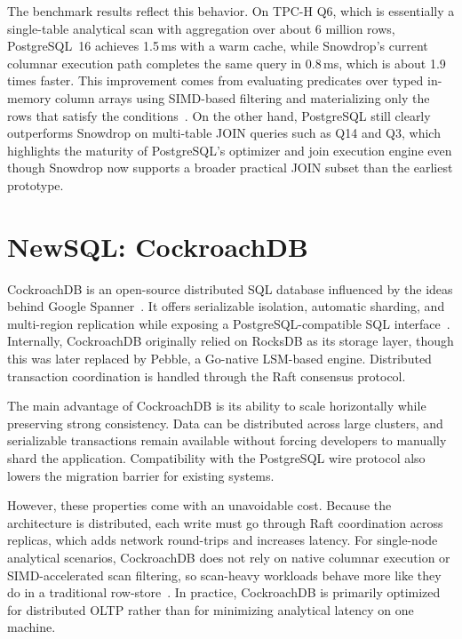 The benchmark results reflect this behavior. On TPC-H Q6, which is essentially a single-table analytical scan with aggregation over about 6 million rows, PostgreSQL~16 achieves 1.5\,ms with a warm cache, while Snowdrop’s current columnar execution path completes the same query in 0.8\,ms, which is about 1.9 times faster. This improvement comes from evaluating predicates over typed in-memory column arrays using SIMD-based filtering and materializing only the rows that satisfy the conditions~\cite{zhou2002}. On the other hand, PostgreSQL still clearly outperforms Snowdrop on multi-table JOIN queries such as Q14 and Q3, which highlights the maturity of PostgreSQL’s optimizer and join execution engine even though Snowdrop now supports a broader practical JOIN subset than the earliest prototype.

\section{NewSQL: CockroachDB}

CockroachDB is an open-source distributed SQL database influenced by the ideas behind Google Spanner~\cite{corbett2012}. It offers serializable isolation, automatic sharding, and multi-region replication while exposing a PostgreSQL-compatible SQL interface~\cite{cockroachdb2025}. Internally, CockroachDB originally relied on RocksDB as its storage layer, though this was later replaced by Pebble, a Go-native LSM-based engine. Distributed transaction coordination is handled through the Raft consensus protocol.

The main advantage of CockroachDB is its ability to scale horizontally while preserving strong consistency. Data can be distributed across large clusters, and serializable transactions remain available without forcing developers to manually shard the application. Compatibility with the PostgreSQL wire protocol also lowers the migration barrier for existing systems.

However, these properties come with an unavoidable cost. Because the architecture is distributed, each write must go through Raft coordination across replicas, which adds network round-trips and increases latency. For single-node analytical scenarios, CockroachDB does not rely on native columnar execution or SIMD-accelerated scan filtering, so scan-heavy workloads behave more like they do in a traditional row-store~\cite{abadi2013}. In practice, CockroachDB is primarily optimized for distributed OLTP rather than for minimizing analytical latency on one machine.

